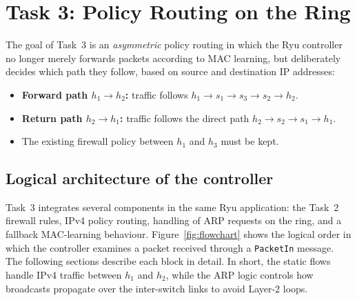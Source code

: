 \documentclass[11pt,a4paper]{article}
\newcommand{\code}[1]{\texttt{#1}}
\begin{document}
\section{Task 3: Policy Routing on the Ring}
The goal of Task~3 is an \emph{asymmetric} policy routing in which the Ryu
controller no longer merely forwards packets according to MAC learning, but
deliberately decides which path they follow, based on source and destination IP
addresses:
\begin{itemize}
  \item \textbf{Forward path $h_1\to h_2$:} traffic follows
        $h_1\to s_1\to s_3\to s_2\to h_2$.
  \item \textbf{Return path $h_2\to h_1$:} traffic follows the direct path
        $h_2\to s_2\to s_1\to h_1$.
  \item The existing firewall policy between $h_1$ and $h_3$ must be kept.
\end{itemize}

\subsection{Logical architecture of the controller}
Task~3 integrates several components in the same Ryu application: the Task~2
firewall rules, IPv4 policy routing, handling of ARP requests on the ring, and a
fallback MAC-learning behaviour. Figure~\ref{fig:flowchart} shows the logical
order in which the controller examines a packet received through a
\code{PacketIn} message. The following sections describe each block in detail.
In short, the static flows handle IPv4 traffic between $h_1$ and $h_2$, while
the ARP logic controls how broadcasts propagate over the inter-switch links to
avoid Layer-2 loops.
\end{document}
